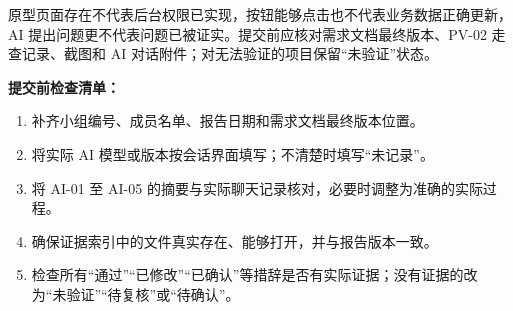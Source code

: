 \documentclass[heading=true,UTF8,a4paper,zihao=-4]{ctexart}
\begin{document}
原型页面存在不代表后台权限已实现，按钮能够点击也不代表业务数据正确更新，AI 提出问题更不代表问题已被证实。提交前应核对需求文档最终版本、PV-02 走查记录、截图和 AI 对话附件；对无法验证的项目保留“未验证”状态。

\noindent\textbf{提交前检查清单：}
\begin{enumerate}
\item 补齐小组编号、成员名单、报告日期和需求文档最终版本位置。
\item 将实际 AI 模型或版本按会话界面填写；不清楚时填写“未记录”。
\item 将 AI-01 至 AI-05 的摘要与实际聊天记录核对，必要时调整为准确的实际过程。
\item 确保证据索引中的文件真实存在、能够打开，并与报告版本一致。
\item 检查所有“通过”“已修改”“已确认”等措辞是否有实际证据；没有证据的改为“未验证”“待复核”或“待确认”。
\end{enumerate}
\end{document}
